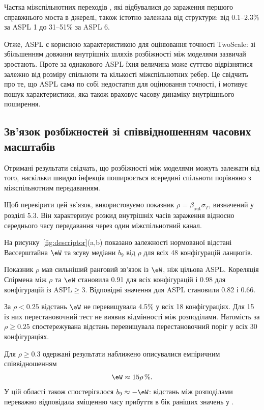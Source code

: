 Частка міжспільнотних переходів
\TS{}, які відбувалися до зараження
першого справжнього моста в джерелі,
також істотно залежала від структури:
від 0.1--2.3\% за ASPL 1
до 31--51\% за ASPL 6.

Отже, ASPL є корисною характеристикою
для оцінювання точності TwoScale:
зі збільшенням довжини внутрішніх
шляхів розбіжності між моделями
зазвичай зростають. Проте за однакового
ASPL їхня величина може суттєво
відрізнятися залежно від розміру
спільноти та кількості міжспільнотних
ребер. Це свідчить про те, що ASPL
сама по собі недостатня для оцінювання
точності, і мотивує пошук характеристики,
яка також враховує часову динаміку
внутрішнього поширення.


\subsection{Зв'язок розбіжностей
зі співвідношенням часових масштабів}
\label{sec:res_descriptor}

Отримані результати свідчать,
що розбіжності між моделями
можуть залежати від того,
наскільки швидко інфекція
поширюється всередині спільноти
порівняно з міжспільнотним
передаванням.

Щоб перевірити цей зв'язок,
використовуємо показник
$\rho=\beta_{\mathrm{out}}\sigma_T$,
визначений у розділі 5.3.
Він характеризує розкид
внутрішніх часів зараження
відносно середнього часу
передавання через один
міжспільнотний канал.

На рисунку~\ref{fig:descriptor}(a,b)
показано залежності нормованої
відстані Вассерштайна $\eW$
та зсуву медіани $b_9$
від $\rho$ для всіх
48 конфігурацій ланцюгів.

Показник $\rho$ мав сильніший
ранговий зв'язок із $\eW$,
ніж цільова ASPL.
Кореляція Спірмена між
$\rho$ та $\eW$ становила
0.91 для всіх конфігурацій
і 0.98 для конфігурацій
із $\mathrm{ASPL}\geq3$.
Відповідні значення
для ASPL становили 0.82 і 0.66.

За $\rho<0.25$ відстань $\eW$
не перевищувала 4.5\%
у всіх 18 конфігураціях.
Для 15 із них перестановочний
тест не виявив відмінності
між розподілами.
Натомість за $\rho\geq0.25$
спостережувана відстань
перевищувала перестановочний
поріг у всіх 30 конфігураціях.

Для $\rho\geq0.3$
одержані результати наближено
описувалися емпіричним
співвідношенням
\begin{equation}
\eW \approx 15\rho\,\%.
\end{equation}
У цій області також
спостерігалося
$b_9\approx-\eW$:
відстань між розподілами
переважно відповідала
зміщенню часу прибуття
в бік раніших значень
у \TS{}.

